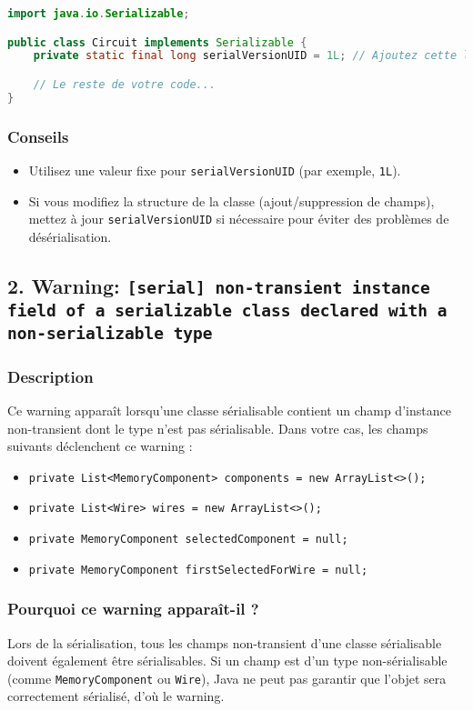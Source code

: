 \documentclass[a4paper,12pt]{article}
\begin{document}
\begin{lstlisting}[language=java]
import java.io.Serializable;

public class Circuit implements Serializable {
    private static final long serialVersionUID = 1L; // Ajoutez cette ligne

    // Le reste de votre code...
}
\end{lstlisting}

\subsubsection*{Conseils}
\begin{itemize}
    \item Utilisez une valeur fixe pour \texttt{serialVersionUID} (par exemple, \texttt{1L}).
    \item Si vous modifiez la structure de la classe (ajout/suppression de champs), mettez à jour \texttt{serialVersionUID} si nécessaire pour éviter des problèmes de désérialisation.
\end{itemize}

\subsection*{2. Warning: \texttt{[serial] non-transient instance field of a serializable class declared with a non-serializable type}}

\subsubsection*{Description}
Ce warning apparaît lorsqu'une classe sérialisable contient un champ d'instance non-transient dont le type n'est pas sérialisable. Dans votre cas, les champs suivants déclenchent ce warning :
\begin{itemize}
    \item \texttt{private List<MemoryComponent> components = new ArrayList<>();}
    \item \texttt{private List<Wire> wires = new ArrayList<>();}
    \item \texttt{private MemoryComponent selectedComponent = null;}
    \item \texttt{private MemoryComponent firstSelectedForWire = null;}
\end{itemize}

\subsubsection*{Pourquoi ce warning apparaît-il ?}
Lors de la sérialisation, tous les champs non-transient d'une classe sérialisable doivent également être sérialisables. Si un champ est d'un type non-sérialisable (comme \texttt{MemoryComponent} ou \texttt{Wire}), Java ne peut pas garantir que l'objet sera correctement sérialisé, d'où le warning.
\end{document}
